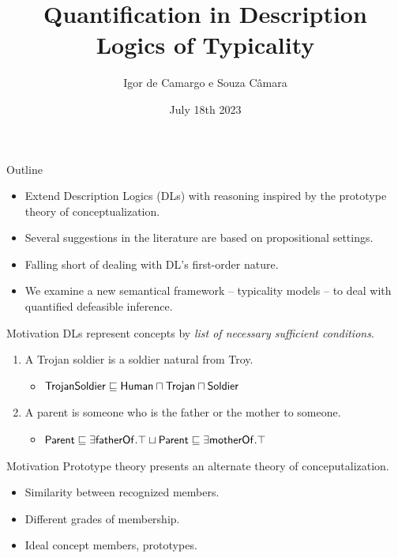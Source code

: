 \documentclass[10pt, xcolor=dvipsnames]{beamer}
\title{Quantification in Description Logics of Typicality}
\date{July 18th 2023}
\author{Igor de Camargo e Souza Câmara}
\institute{University of São Paulo}
\begin{document}
\begin{frame}[plain]
  \titlepage
\end{frame}

%
%

\begin{frame}[fragile]{Outline}
  \large
  \begin{itemize}
    \item Extend Description Logics (DLs) with reasoning inspired by the prototype theory of conceptualization.
    \item Several suggestions in the literature are based on propositional settings.
    \item Falling short of dealing with DL's first-order nature.
    \item We examine a new semantical framework -- typicality models -- to deal with quantified defeasible inference. 
  \end{itemize}
\end{frame}

\begin{frame}[fragile]{Motivation}
\large
DLs represent concepts by \emph{list of necessary sufficient conditions}.

\begin{enumerate}
  \item A Trojan soldier is a soldier natural from Troy.
  \begin{itemize}
    \item $\mathsf{TrojanSoldier} \sqsubseteq \mathsf{Human} \sqcap \mathsf{Trojan} \sqcap \mathsf{Soldier}$
  \end{itemize} \pause
  \item A parent is someone who is the father or the mother to someone.
  \begin{itemize}
    \item $\mathsf{Parent} \sqsubseteq \exists \mathsf{fatherOf}.\top \sqcup \mathsf{Parent} \sqsubseteq \exists \mathsf{motherOf}.\top$
  \end{itemize}
\end{enumerate}
\end{frame}

\begin{frame}[fragile]{Motivation}
  \large
  Prototype theory presents an alternate theory of conceputalization.

  \begin{itemize}
    \item Similarity between recognized members.
    \item Different grades of membership.
    \item Ideal concept members, \ie prototypes.
  \end{itemize}
\end{frame}
  
\end{document}
